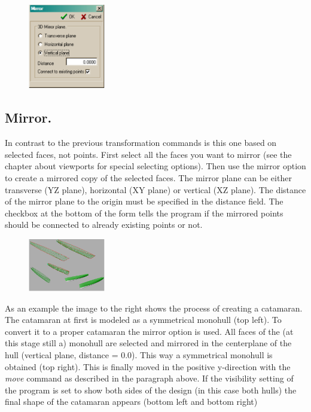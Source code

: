\documentclass[12pt]{article}
\begin{document}
\begin{figure}
        \centering
        \includegraphics[width=0.3\textwidth,natwidth=279,natheight=308]{mirrordialog.png}
        \caption{}
        \label{fig:mirrordialog}
\end{figure}

\subsection{Mirror.}
In contrast to the previous transformation commands is this one based
on selected faces, not points. First select all the faces you want to
mirror (see the chapter about viewports for special selecting
options). Then use the mirror option to create a mirrored copy of the
selected faces. The mirror plane can be either transverse (YZ plane),
horizontal (XY plane) or vertical (XZ plane). The distance of the
mirror plane to the origin must be specified in the distance field.
The checkbox at the bottom of the form tells the program if the
mirrored points should be connected to already existing points or not.

\begin{figure}
        \centering
        \includegraphics[width=0.3\textwidth,natwidth=443,natheight=303]{mirrorcatamaran.png}
        \caption{}
        \label{fig:mirrorcatamaran}
\end{figure}

As an example the image to the right shows the process of creating a
catamaran. The catamaran at first is modeled as a symmetrical monohull
(top left). To convert it to a proper catamaran the mirror option is
used. All faces of the (at this stage still a) monohull are selected
and mirrored in the centerplane of the hull (vertical plane, distance
= 0.0). This way a symmetrical monohull is obtained (top right). This
is finally moved in the positive y-direction with the \textit{move} command as
described in the paragraph above. If the visibility setting of the
program is set to show both sides of the design (in this case both
hulls) the final shape of the catamaran appears (bottom left and
bottom right)
\end{document}
